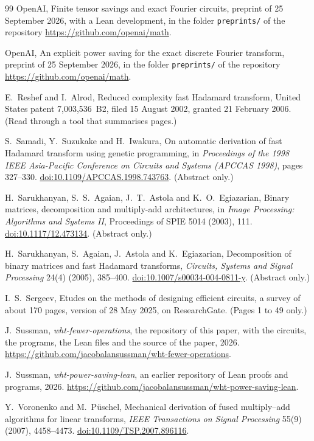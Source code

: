 \documentclass[10pt]{article}
\theoremstyle{remark}
\newcommand{\reponame}{wht-fewer-operations}
\newcommand{\repourl}{https://github.com/jacobalansussman/\reponame}
\begin{document}
\begin{thebibliography}{99}
OpenAI, Finite tensor savings and exact Fourier circuits, preprint of 25 September 2026, with a Lean
development, in the folder \texttt{preprints/} of the repository \url{https://github.com/openai/math}.

OpenAI, An explicit power saving for the exact discrete Fourier transform, preprint of 25 September 2026, in
the folder \texttt{preprints/} of the repository \url{https://github.com/openai/math}.

E.~Reshef and I.~Alrod, Reduced complexity fast Hadamard transform, United States patent 7,003,536~B2, filed
15 August 2002, granted 21 February 2006. (Read through a tool that summarises pages.)

S.~Samadi, Y.~Suzukake and H.~Iwakura, On automatic derivation of fast Hadamard transform using genetic
programming, in \emph{Proceedings of the 1998 IEEE Asia-Pacific Conference on Circuits and Systems
(APCCAS 1998)}, pages 327--330.
\href{https://doi.org/10.1109/APCCAS.1998.743763}{doi:10.1109/APCCAS.1998.743763}. (Abstract only.)

H.~Sarukhanyan, S.~S.~Agaian, J.~T.~Astola and K.~O.~Egiazarian, Binary matrices, decomposition and
multiply-add architectures, in \emph{Image Processing: Algorithms and Systems II}, Proceedings of SPIE 5014
(2003), 111.
\href{https://doi.org/10.1117/12.473134}{doi:10.1117/12.473134}. (Abstract only.)

H.~Sarukhanyan, S.~Agaian, J.~Astola and K.~Egiazarian, Decomposition of binary matrices and fast Hadamard
transforms, \emph{Circuits, Systems and Signal Processing} 24(4) (2005), 385--400.
\href{https://doi.org/10.1007/s00034-004-0811-y}{doi:10.1007/s00034-004-0811-y}. (Abstract only.)

I.~S.~Sergeev, Etudes on the methods of designing efficient circuits, a survey of about 170 pages, version
of 28 May 2025, on ResearchGate. (Pages 1 to 49 only.)

J.~Sussman, \emph{\reponame}, the repository of this paper, with the circuits, the programs, the Lean files
and the source of the paper, 2026. \url{\repourl}.

J.~Sussman, \emph{wht-power-saving-lean}, an earlier repository of Lean proofs and programs, 2026.
\url{https://github.com/jacobalansussman/wht-power-saving-lean}.

Y.~Voronenko and M.~P\"uschel, Mechanical derivation of fused multiply--add algorithms for linear transforms,
\emph{IEEE Transactions on Signal Processing} 55(9) (2007), 4458--4473.
\href{https://doi.org/10.1109/TSP.2007.896116}{doi:10.1109/TSP.2007.896116}.

\end{thebibliography}
\end{document}
